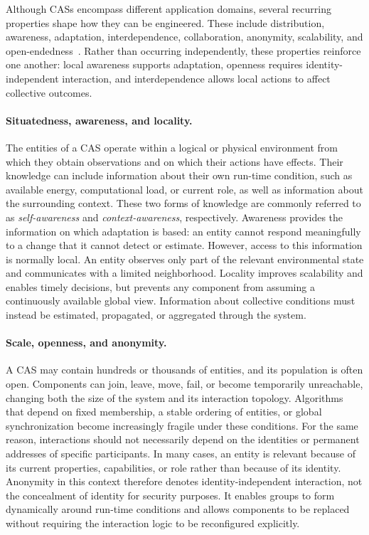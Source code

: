 Although \glspl{CAS} encompass different application domains, 
 several recurring properties shape how they can be engineered.
%
These include distribution, awareness, adaptation, interdependence, 
 collaboration, anonymity, scalability, and open-endedness~\cite{DBLP:journals/scp/AlrahmanNL20}.
%
Rather than occurring independently, these properties reinforce one another:
 local awareness supports adaptation, openness requires identity-independent
 interaction, and interdependence allows local actions to affect collective
 outcomes.

\paragraph{Situatedness, awareness, and locality.}
The entities of a \gls{CAS} operate within a logical or physical environment
 from which they obtain observations and on which their actions have effects.
%
Their knowledge can include information about their own run-time condition,
 such as available energy, computational load, or current role, as well as
 information about the surrounding context.
%
These two forms of knowledge are commonly referred to as
 \emph{self-awareness} and \emph{context-awareness}, respectively.
%
Awareness provides the information on which adaptation is based: an entity
 cannot respond meaningfully to a change that it cannot detect or estimate.
%
However, access to this information is normally local.
%
An entity observes only part of the relevant environmental state and
 communicates with a limited neighborhood.
%
Locality improves scalability and enables timely decisions, but prevents any
 component from assuming a continuously available global view.
%
Information about collective conditions must instead be estimated, propagated,
 or aggregated through the system.

\paragraph{Scale, openness, and anonymity.}
A \gls{CAS} may contain hundreds or thousands of entities, and its population
 is often open.
%
Components can join, leave, move, fail, or become temporarily unreachable,
 changing both the size of the system and its interaction topology.
%
Algorithms that depend on fixed membership, a stable ordering of entities,
 or global synchronization become increasingly fragile under these conditions.
%
For the same reason, interactions should not necessarily depend on the
 identities or permanent addresses of specific participants.
%
In many cases, an entity is relevant because of its current properties,
 capabilities, or role rather than because of its identity.
%
Anonymity in this context therefore denotes identity-independent interaction,
 not the concealment of identity for security purposes.
%
It enables groups to form dynamically around run-time conditions and allows
 components to be replaced without requiring the interaction logic to be
 reconfigured explicitly.

